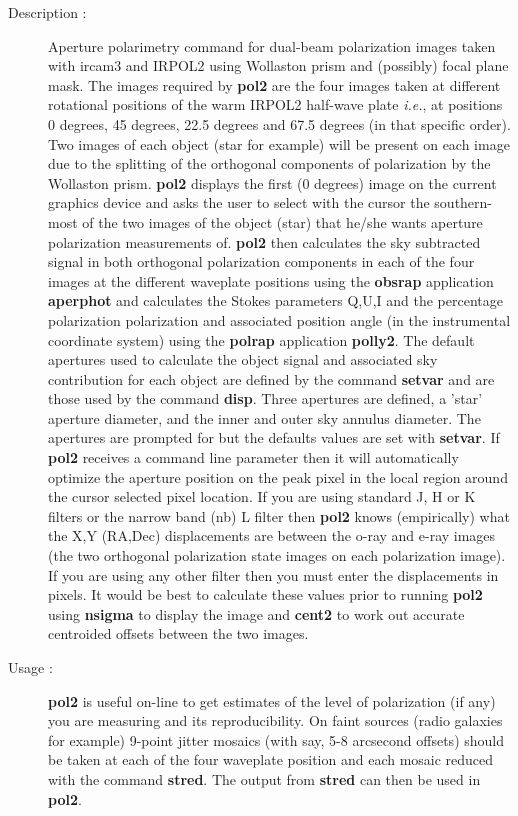 \begin{description}

\item[Description :] Aperture polarimetry command for dual-beam
polarization images taken with {\sc ircam3} and IRPOL2 using Wollaston
prism and (possibly) focal plane mask. The images required by {\bf
pol2} are the four images taken at different rotational positions of
the warm {\sc IRPOL2} half-wave plate \emph{i.e.}, at positions 0
degrees, 45 degrees, 22.5 degrees and 67.5 degrees (in that specific
order).  Two images of each object (star for example) will be present
on each image due to the splitting of the orthogonal components of
polarization by the Wollaston prism.  {\bf pol2} displays the first (0
degrees) image on the current graphics device and asks the user to
select with the cursor the southern-most of the two images of the
object (star) that he/she wants aperture polarization measurements of.
{\bf pol2} then calculates the sky subtracted signal in both orthogonal
polarization components in each of the four images at the different
waveplate positions using the {\bf obsrap} application {\bf aperphot}
and calculates the Stokes parameters Q,U,I and the percentage
polarization polarization and associated position angle (in the
instrumental coordinate system) using the {\bf polrap} application {\bf
polly2}.  The default apertures used to calculate the object signal and
associated sky contribution for each object are defined by the command
{\bf setvar} and are those used by the command {\bf disp}.  Three
apertures are defined, a 'star' aperture diameter, and the inner and
outer sky annulus diameter. The apertures are prompted for but the
defaults values are set with {\bf setvar}. If {\bf pol2} receives a
command line parameter then it will automatically optimize the aperture
position on the peak pixel in the local region around the cursor
selected pixel location.  If you are using standard J, H or K filters
or the narrow band (nb) L filter then {\bf pol2}  knows (empirically)
what the X,Y (RA,Dec) displacements are between the o-ray and e-ray
images (the two orthogonal polarization state images on each
polarization image).  If you are using any other filter then you must
enter the displacements in pixels.  It would be best to calculate these
values prior to running {\bf pol2}  using {\bf nsigma} to display the
image and {\bf cent2} to work out accurate centroided
offsets between the two images.

\item[Usage :] {\bf pol2} is useful on-line to get estimates of the level of
polarization (if any) you are measuring and its reproducibility.  On
faint sources (radio galaxies for example) 9-point jitter mosaics (with
say, 5-8 arcsecond offsets) should be taken at each of the four waveplate
position and each mosaic reduced with the command {\bf stred}.  The output from
{\bf stred} can then be used in {\bf pol2}.


\end{description}
